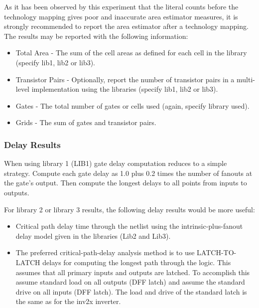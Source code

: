 {\begin{pespace}
As it has been observed by this experiment that the literal counts
before the technology mapping gives poor and inaccurate area estimator
measures, it is strongly recommended to report the area estimator after
a technology mapping.
The results may be reported with
the following information:

\begin{itemize}

\item Total Area - The sum of the cell areas as defined for each cell in the 
library (specify lib1, lib2 or lib3).

\item Transistor Pairs - Optionally, 
report the number of transistor pairs in a 
multi-level implementation using
the libraries (specify lib1, lib2 or lib3).

\item Gates - The total number of 
gates or cells used (again, specify library used).

\item Grids - The sum of gates and transistor pairs.
\end{itemize}

\subsubsection{ Delay Results}
When using library 1 (LIB1)
gate delay computation reduces to 
a simple strategy.
Compute each gate delay as 1.0 plus 0.2 times the number of fanouts
at the gate's output.  Then compute the longest delays to all points
from inputs to outputs.


For library 2 or library 3 results, 
the following delay results would be more useful:

\begin{itemize}

\item Critical path delay time through the netlist using the
intrinsic-plus-fanout delay model given in the libraries (Lib2 and Lib3).

\item The preferred critical-path-delay analysis method is to use
LATCH-TO-LATCH delays for computing the longest path through the logic.
This assumes that all primary inputs and outputs are latched. 
To accomplish this assume standard load on all outputs (DFF latch)
and assume the standard drive on all inputs (DFF latch).
The load and drive of the standard latch is the same as for the inv2x
inverter.


\end{itemize}
\end{pespace}}
